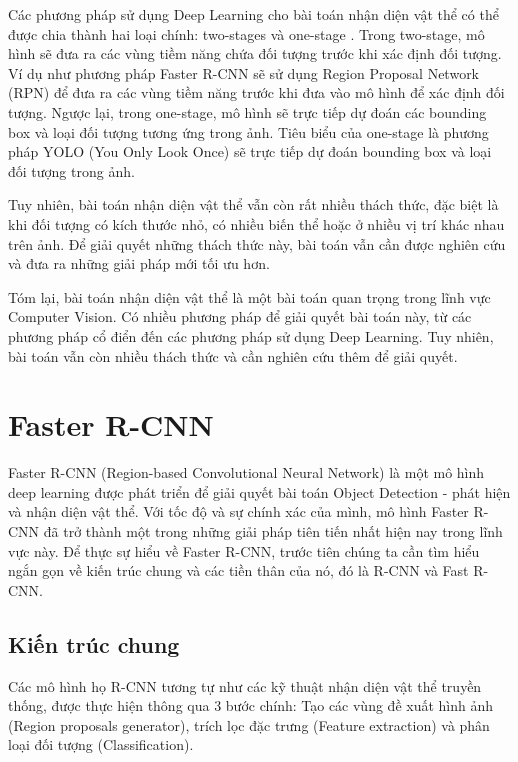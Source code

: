 Các phương pháp sử dụng Deep Learning cho bài toán nhận diện vật thể có thể được chia thành hai loại chính: two-stages và one-stage \cite{Deng2020}. Trong two-stage, mô hình sẽ đưa ra các vùng tiềm năng chứa đối tượng trước khi xác định đối tượng. Ví dụ như phương pháp Faster R-CNN sẽ sử dụng Region Proposal Network (RPN) để đưa ra các vùng tiềm năng trước khi đưa vào mô hình để xác định đối tượng. Ngược lại, trong one-stage, mô hình sẽ trực tiếp dự đoán các bounding box và loại đối tượng tương ứng trong ảnh. Tiêu biểu của one-stage là phương pháp YOLO (You Only Look Once) sẽ trực tiếp dự đoán bounding box và loại đối tượng trong ảnh.

Tuy nhiên, bài toán nhận diện vật thể vẫn còn rất nhiều thách thức, đặc biệt là khi đối tượng có kích thước nhỏ, có nhiều biến thể hoặc ở nhiều vị trí khác nhau trên ảnh. Để giải quyết những thách thức này, bài toán vẫn cần được nghiên cứu và đưa ra những giải pháp mới tối ưu hơn.



Tóm lại, bài toán nhận diện vật thể là một bài toán quan trọng trong lĩnh vực Computer Vision. Có nhiều phương pháp để giải quyết bài toán này, từ các phương pháp cổ điển đến các phương pháp sử dụng Deep Learning. Tuy nhiên, bài toán vẫn còn nhiều thách thức và cần nghiên cứu thêm để giải quyết.


\section{Faster R-CNN}

Faster R-CNN (Region-based Convolutional Neural Network) là một mô hình deep learning được phát triển để giải quyết bài toán Object Detection - phát hiện và nhận diện vật thể. Với tốc độ và sự chính xác của mình, mô hình Faster R-CNN đã trở thành một trong những giải pháp tiên tiến nhất hiện nay trong lĩnh vực này. Để thực sự hiểu về Faster R-CNN, trước tiên chúng ta cần tìm hiểu ngắn gọn về kiến trúc chung và các tiền thân của nó, đó là R-CNN và Fast R-CNN.

\subsection{Kiến trúc chung}
Các mô hình họ R-CNN tương tự như các kỹ thuật nhận diện vật thể truyền thống, được thực hiện thông qua 3 bước chính: Tạo các vùng đề xuất hình ảnh (Region proposals generator), trích lọc đặc trưng (Feature extraction) và phân loại đối tượng (Classification). 

